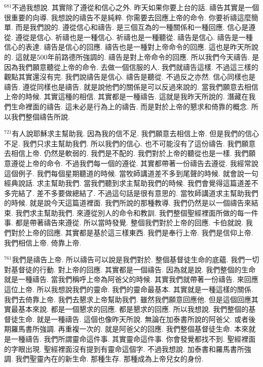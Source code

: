 \documentclass{book}
\begin{document}
$^{681}$不過我想說.
其實除了遵從和信心之外.
昨天如果你要上台的話.
禱告其實是一個很重要的向導.
我想說的禱告不是純粹.
你需要去回應上帝的命令.
你要祈禱這麼簡單.
而是我們說的.
遵從信心和禱告.
是三個互為的一種關係和一種回應.
信心是遵從.
遵從是信心.
祈禱也是一種信心.
祈禱也是一種聽從.
禱告是信心.
禱告是一種信心的表達.
禱告是信心的回應.
禱告也是一種對上帝命令的回應.
這也是昨天所說的.
這就是500年前路德所強調的.
禱告是對上帝命令的回應.
所以我們今天禱告.
是因為我們願意聽從上帝的命令.
去做一個信服的人.
我們就禱告這樣.
不過這三樣的觀點其實還沒有完.
我們說禱告是信心.
禱告是聽從.
不過反之亦然.
信心同樣也是禱告.
遵從同樣也是禱告.
就是說他們的關係是可以反過來說的.
當我們願意去相信上帝的時候.
其實這種的相信.
其實都是一種禱告.
這就是我昨天所說的.
潛藏在我們生命裡面的禱告.
這未必是行為上的禱告.
而是對於上帝的懇求和倚靠的概念.
所以我們整個禱告所說.

$^{721}$有人說耶穌求主幫助我.
因為我的信不足.
我們願意去相信上帝.
但是我們的信心不足.
我們只求主幫助我們.
所以我們的信心.
也不可能沒有了這份禱告.
我們願意去相信上帝.
仍然是軟弱的.
我們是不配的.
我們對於上帝的聽從也是一樣.
我們願意遵從上帝的命令.
不過我們每一個的遵從.
其實都帶著一份禱告去遵從.
我經常說這個例子.
我們每個星期聽道的時候.
當牧師講道差不多到尾聲的時候.
就會說一句經典說話.
求主幫助我們.
當我們聽到求主幫助我們的時候.
我們會覺得這篇道差不多完結了.
差不多要做總結了.
不過這句話是很有意思的.
當牧師講道求主幫助我們的時候.
就是說今天這篇道裡面.
我們所說的那種教導.
我們仍然是以一個禱告來結束.
我們求主幫助我們.
來遵從別人的命令和教訓.
我們整個聖經裡面所做的每一件事.
都是帶著禱告來遵從.
所以當時發覺.
整個我們對於上帝的回應.
卡伯就說.
我們對於上帝的回應.
其實都是基於這三樣東西.
我們是奉行上帝.
我們是信仰上帝.
我們相信上帝.
倚靠上帝.

$^{761}$我們是禱告上帝.
所以禱告可以說是我們對於.
整個基督徒生命的底蘊.
我們一切對基督徒的行動.
對上帝的回應.
其實都是一個禱告.
因為就是說.
我們整個的生命就是一種禱告.
當我們稱呼上帝為阿爸父的時候.
其實我們就帶著一份禱告.
來回應這位上帝.
所以我想說我們的靈命.
我們的靈命最基本.
其實就是一種這樣的關係.
我們去倚靠上帝.
我們去懇求上帝幫助我們.
雖然我們願意回應他.
但是這個回應其實最基本來說.
都是一個懇求的回應.
都是懇求的回應.
所以我想說.
我們整個的基督徒生命.
就是一種禱告.
這個也像昨天所說.
無論在加泰書所說的阿爸父.
或者後期羅馬書所強調.
再重複一次的.
就是阿爸父的回應.
我們整個基督徒生命.
本來就是一種禱告.
我們所謂靈命這件事.
其實靈命這件事.
你會發覺都找不到.
聖經裡面的字眼出現.
聖經裡面沒有提到有靈命這個字.
不過我想說.
加泰書和羅馬書所強調.
我們聖靈內在的新生命.
那種生存.
那種成為上帝兒女的身份.
\end{document}
